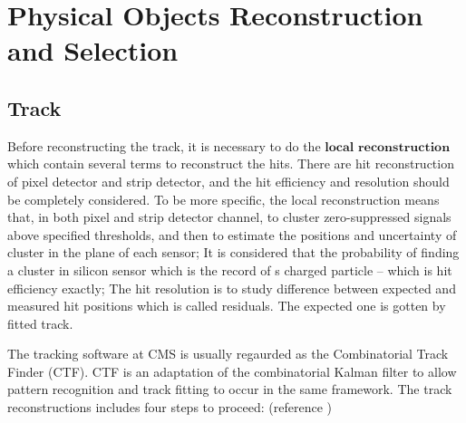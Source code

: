 

\section{Physical Objects Reconstruction and Selection}
\label{sec:PhysObj}


	\subsection{Track}
	\label{ssec:PhysObj_track}

		Before reconstructing the track, it is necessary to do the $\textbf{local reconstruction}$ which contain several terms to reconstruct the hits. There are hit reconstruction of pixel detector and strip detector, and the hit efficiency and resolution should be completely considered. To be more specific, the local reconstruction means that, in both pixel and strip detector channel, to cluster zero-suppressed signals above specified thresholds, and then to estimate the positions and uncertainty of cluster in the plane of each sensor; It is considered that the probability of finding a cluster in silicon sensor which is the record of s charged particle -- which is hit efficiency exactly; The hit resolution is to study difference between expected and measured hit positions which is called residuals. The expected one is gotten by fitted track.

		The tracking software at CMS is usually regaurded as the Combinatorial Track Finder (CTF)\cite{Billoir1989ProgressiveTR}. CTF is an adaptation of the combinatorial Kalman filter\cite{Fruhwirth:1987fm} to allow pattern recognition and track fitting to occur in the same framework.
		The track reconstructions includes four steps to proceed: (reference \cite{Chatrchyan:2014fea})

